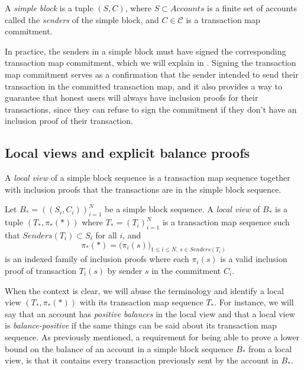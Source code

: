 \begin{defn}
  A \emph{simple block} is a tuple \((S,C)\), where \(S \subset Accounts\) is a finite set of accounts called the \emph{senders} of the simple block, and \(C \in \mathcal{C}\) is a transaction map commitment.
\end{defn}

In practice, the senders in a simple block must have signed the corresponding transaction map commitment, which we will explain in . Signing the transaction map commitment serves as a confirmation that the sender intended to send their transaction in the committed transaction map, and it also provides a way to guarantee that honest users will always have inclusion proofs for their transactions, since they can refuse to sign the commitment if they don't have an inclusion proof of their transaction.

\subsection{Local views and explicit balance proofs}

A \emph{local view} of a simple block sequence is a transaction map sequence together with inclusion proofs that the transactions are in the simple block sequence.

\begin{defn}
  Let \(B_* = ((S_i,C_i))_{i=1}^N\) be a simple block sequence. A \emph{local view} of \(B_*\) is a tuple \((T_*, \pi_*(*))\) where \(T_* = (T_i)_{i=1}^N\) is a transaction map sequence such that \(Senders(T_i) \subset S_i\) for all \(i\), and \[\pi_*(*) = \bigl(\pi_i(s)\bigr)_{1 \leq i \leq N,\ s \in Senders(T_i)}\] is an indexed family of inclusion proofs where each \(\pi_i(s)\) is a valid inclusion proof of transaction \(T_i(s)\) by sender \(s\) in the commitment \(C_i\).
\end{defn}

When the context is clear, we will abuse the terminology and identify a local view \((T_*,\pi_*(*))\) with its transaction map sequence \(T_*\). For instance, we will say that an account has \emph{positive balances} in the local view and that a local view is \emph{balance-positive} if the same things can be said about its transaction map sequence. As previously mentioned, a requirement for being able to prove a lower bound on the balance of an account in a simple block sequence \(B_*\) from a local view, is that it contains every transaction previously sent by the account in \(B_*\).

